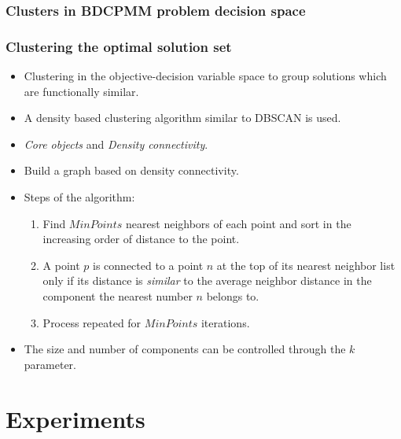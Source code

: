 \documentclass[svgnames, table, smaller]{beamer}
\begin{document}
\begin{frame}
  \frametitle{Clusters in BDCPMM problem decision space}

\end{frame}

\begin{frame}[allowframebreaks]
  \frametitle{Clustering the optimal solution set}
  
  \begin{itemize}
  \item Clustering in the objective-decision variable space to group solutions
    which are functionally similar.
  \item A density based clustering algorithm similar to DBSCAN is used.
  \item {\em Core objects} and {\em Density connectivity}.
  \item Build a graph based on density connectivity.

  \item Steps of the algorithm:
    \begin{enumerate}
    \item Find $MinPoints$ nearest neighbors of each point and sort in the
      increasing order of distance to the point.
    \item A point $p$ is connected to a point $n$ at the top of its nearest
      neighbor list only if its distance is {\em similar} to the average
      neighbor distance in the component the nearest number $n$ belongs to.
    \item Process repeated for $MinPoints$ iterations.
    \end{enumerate}
  \item The size and number of components can be controlled through the $k$ 
    parameter.
  \end{itemize}
\end{frame}


\section{Experiments}
\end{document}

